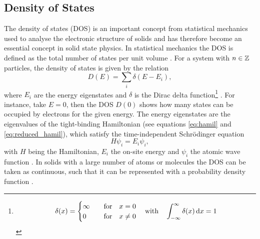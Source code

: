 
\subsection{Density of States}\label{density_of_states}

The density of states (DOS) is an important concept from statistical mechanics used to analyse the electronic structure of solids and has therefore become an essential concept in solid state physics. In statistical mechanics the DOS is defined as the total number of states per unit volume \cite{Quinn2018}. For a system with $n\in\mathbb{Z}$ particles, the density of states is given by the relation
\begin{equation}\label{eq:DOS}
    D(E)=\sum_i\delta(E-E_i),
\end{equation}
where $E_i$ are the energy eigenstates and $\delta$ is the Dirac delta function\footnote{
\begin{equation}\label{eq:dirac}
    \delta (x)=\begin{cases}\infty &\quad \mathrm{for} \quad x=0\\0 &\quad \mathrm{for} \quad x\neq 0\end{cases} \quad \mathrm{with} \quad
    \int_{-\infty}^{\infty} \delta(x)\,\mathrm{d} x=1
\end{equation}} \cite{Kittel2004}. For instance, take $E=0$, then the DOS $D(0)$ shows how many states can be occupied by electrons for the given energy. The energy eigenstates are the eigenvalues of the tight-binding Hamiltonian (see equations \ref{eq:hamil} and \ref{eq:reduced_hamil}), which satisfy the time-independent Schrödinger equation
\begin{equation}\label{eq:time_ind_schrödinger}
    H\psi_i = E_i\psi_i,
\end{equation}
with $H$ being the Hamiltonian, $E_i$ the on-site energy and $\psi_i$ the atomic wave function \cite{Griffiths2018}. In solids with a large number of atoms or molecules the DOS can be taken as continuous, such that it can be represented with a probability density function \cite{Kittel2004}.

